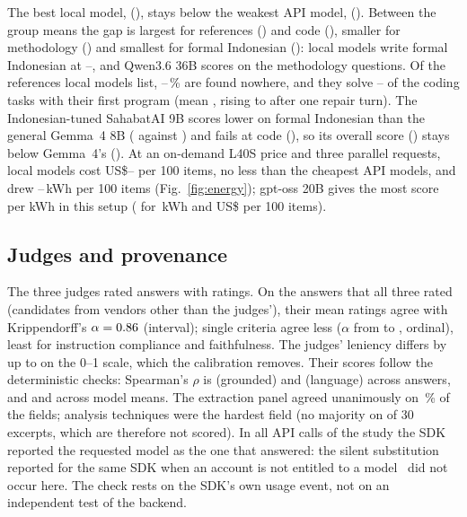 The best local model, \BestLocalName{} (\BestLocalScore{}), stays below the weakest API model, \WorstApiName{} (\WorstApiScore{}). Between the group means the gap is largest for references (\GapRef{}) and code (\GapCode{}), smaller for methodology (\GapMeth{}) and smallest for formal Indonesian (\GapLang{}): local models write formal Indonesian at \LocLangMin{}--\LocLangMax{}, and Qwen3.6 36B scores \TMethodologyQwenThreeSix{} on the methodology questions. Of the references local models list, \NoneLocMin{}--\NoneLocMax{}\,\% are found nowhere, and they solve \LocPassOneMin{}--\LocPassOneMax{} of the coding tasks with their first program (mean \LocPassOneMean{}, rising to \LocRepairMean{} after one repair turn). The Indonesian-tuned SahabatAI 9B scores lower on formal Indonesian than the general Gemma~4 8B (\SahLang{} against \GemmaFourLang{}) and fails at code (\SahCode{}), so its overall score (\SahOverall{}) stays below Gemma~4's (\GemmaFourOverall{}). At an on-demand L40S price and three parallel requests, local models cost US\$\LocUSDMin{}--\LocUSDMax{} per 100 items, no less than the cheapest API models, and drew \LocKwhMin{}--\LocKwhMax{}\,kWh per 100 items (Fig.~\ref{fig:energy}); gpt-oss 20B gives the most score per kWh in this setup (\ScoreGptOss{} for \KwhGptOss{}\,kWh and US\$\UsdGptOss{} per 100 items).

\subsection{Judges and provenance}
The three judges rated \NJudgedAnswers{} answers with \NJudgeCalls{} ratings. On the \NAllJudges{} answers that all three rated (candidates from vendors other than the judges'), their mean ratings agree with Krippendorff's $\alpha=0.86{}$ (interval); single criteria agree less ($\alpha$ from \AlphaCritMin{} to \AlphaCritMax{}, ordinal), least for instruction compliance and faithfulness. The judges' leniency differs by up to \LeniencyRange{} on the 0--1 scale, which the calibration removes. Their scores follow the deterministic checks: Spearman's $\rho$ is \RhoAnsGrd{} (grounded) and \RhoAnsLng{} (language) across answers, and \RhoModelGrd{} and \RhoModelLng{} across model means. The extraction panel agreed unanimously on \SilverUnanimous{}\,\% of the fields; analysis techniques were the hardest field (no majority on \SilverAnalysisNone{} of 30 excerpts, which are therefore not scored). In all \NApiCalls{} API calls of the study the SDK reported the requested model as the one that answered: the silent substitution reported for the same SDK when an account is not entitled to a model~\cite{arya2026paperagent} did not occur here. The check rests on the SDK's own usage event, not on an independent test of the backend.
